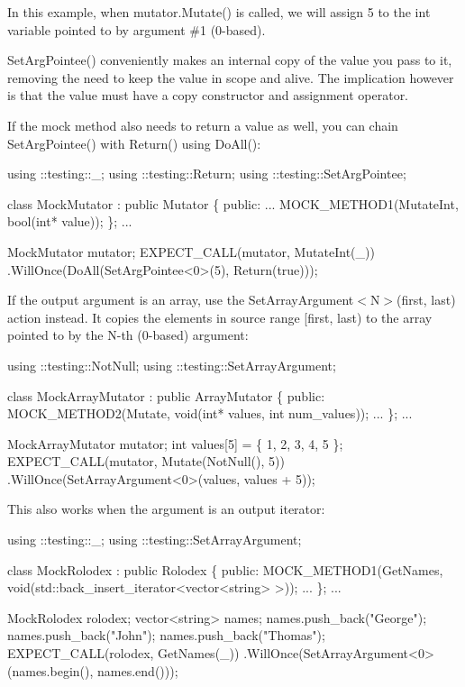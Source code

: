 In this example, when {\ttfamily mutator.\+Mutate()} is called, we will assign 5 to the {\ttfamily int} variable pointed to by argument \#1 (0-\/based).

{\ttfamily Set\+Arg\+Pointee()} conveniently makes an internal copy of the value you pass to it, removing the need to keep the value in scope and alive. The implication however is that the value must have a copy constructor and assignment operator.

If the mock method also needs to return a value as well, you can chain {\ttfamily Set\+Arg\+Pointee()} with {\ttfamily Return()} using {\ttfamily Do\+All()}\+:


\begin{DoxyCode}
using ::testing::\_;
using ::testing::Return;
using ::testing::SetArgPointee;

\textcolor{keyword}{class }MockMutator : \textcolor{keyword}{public} Mutator \{
 \textcolor{keyword}{public}:
  ...
  MOCK\_METHOD1(MutateInt, \textcolor{keywordtype}{bool}(\textcolor{keywordtype}{int}* value));
\};
...

  MockMutator mutator;
  EXPECT\_CALL(mutator, MutateInt(\_))
      .WillOnce(DoAll(SetArgPointee<0>(5),
                      Return(\textcolor{keyword}{true})));
\end{DoxyCode}


If the output argument is an array, use the {\ttfamily Set\+Array\+Argument$<$N$>$(first, last)} action instead. It copies the elements in source range {\ttfamily \mbox{[}first, last)} to the array pointed to by the {\ttfamily N}-\/th (0-\/based) argument\+:


\begin{DoxyCode}
using ::testing::NotNull;
using ::testing::SetArrayArgument;

\textcolor{keyword}{class }MockArrayMutator : \textcolor{keyword}{public} ArrayMutator \{
 \textcolor{keyword}{public}:
  MOCK\_METHOD2(Mutate, \textcolor{keywordtype}{void}(\textcolor{keywordtype}{int}* values, \textcolor{keywordtype}{int} num\_values));
  ...
\};
...

  MockArrayMutator mutator;
  \textcolor{keywordtype}{int} values[5] = \{ 1, 2, 3, 4, 5 \};
  EXPECT\_CALL(mutator, Mutate(NotNull(), 5))
      .WillOnce(SetArrayArgument<0>(values, values + 5));
\end{DoxyCode}


This also works when the argument is an output iterator\+:


\begin{DoxyCode}
using ::testing::\_;
using ::testing::SetArrayArgument;

\textcolor{keyword}{class }MockRolodex : \textcolor{keyword}{public} Rolodex \{
 \textcolor{keyword}{public}:
  MOCK\_METHOD1(GetNames, \textcolor{keywordtype}{void}(std::back\_insert\_iterator<vector<string> >));
  ...
\};
...

  MockRolodex rolodex;
  vector<string> names;
  names.push\_back(\textcolor{stringliteral}{"George"});
  names.push\_back(\textcolor{stringliteral}{"John"});
  names.push\_back(\textcolor{stringliteral}{"Thomas"});
  EXPECT\_CALL(rolodex, GetNames(\_))
      .WillOnce(SetArrayArgument<0>(names.begin(), names.end()));
\end{DoxyCode}


